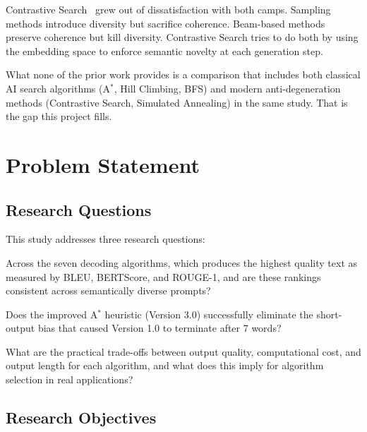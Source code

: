 \documentclass[12pt]{article}
\begin{document}
	Contrastive Search~\cite{su2022contrastive, su2023contrastive_tacl} grew out of dissatisfaction with both camps. Sampling methods introduce diversity but sacrifice coherence. Beam-based methods preserve coherence but kill diversity. Contrastive Search tries to do both by using the embedding space to enforce semantic novelty at each generation step.
	
	What none of the prior work provides is a comparison that includes both classical AI search algorithms (A$^*$, Hill Climbing, BFS) and modern anti-degeneration methods (Contrastive Search, Simulated Annealing) in the same study. That is the gap this project fills.
	
	\section{Problem Statement}
	\label{sec:problem}
	
	\subsection{Research Questions}
	
	This study addresses three research questions:
	
	\begin{description}[leftmargin=2cm, labelwidth=1.8cm]
		\item[RQ1] Across the seven decoding algorithms, which produces the highest quality text as measured by BLEU, BERTScore, and ROUGE-1, and are these rankings consistent across semantically diverse prompts?
		
		\item[RQ2] Does the improved A$^*$ heuristic (Version 3.0) successfully eliminate the short-output bias that caused Version 1.0 to terminate after 7 words?
		
		\item[RQ3] What are the practical trade-offs between output quality, computational cost, and output length for each algorithm, and what does this imply for algorithm selection in real applications?
	\end{description}
	
	\subsection{Research Objectives}
	
\end{document}
